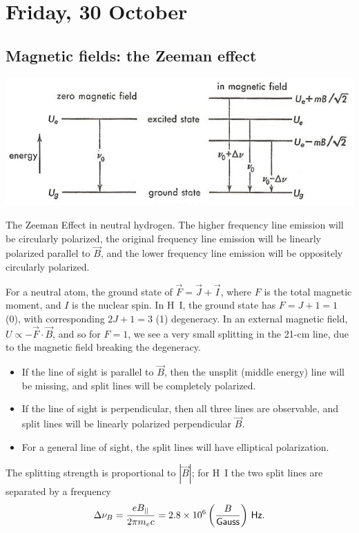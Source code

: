 \documentclass{tufte-handout}
\renewcommand{\rm}{\sf}
\renewcommand{\textrm}{\textsf}
\newcommand{\HI}{\textnormal{H{\smaller~\textsc{I}}}}
\newcommand{\e}[1]{\times 10^{#1}}
\begin{document}
\section{Friday, 30 October}
\subsection{Magnetic fields: the Zeeman effect}

\begin{marginfigure}
\includegraphics{ism_figures/zeeman_effect}
\caption{The Zeeman Effect in neutral hydrogen. The higher frequency line emission will be circularly polarized, the original frequency line emission will be linearly polarized parallel to $\vec B$, and the lower frequency line emission will be oppositely circularly polarized.}
\end{marginfigure}
For a neutral atom, the ground state of $\vec F = \vec J + \vec I$, where $F$ is the total magnetic moment, and $I$ is the nuclear spin. In \HI{}, the ground state has $F = J + 1 = 1$ (0), with corresponding $2J+1 = 3$ (1) degeneracy. In an external magnetic field, $U \propto - \vec F \cdot \vec B$, and so for $F=1$, we see a very small splitting in the 21-cm line, due to the magnetic field breaking the degeneracy.
\begin{itemize}
\item[] If the line of sight is parallel to $\vec B$, then the unsplit (middle energy) line will be missing, and split lines will be completely polarized.
\item[] If the line of sight is perpendicular, then all three lines are observable, and split lines will be linearly polarized perpendicular $\vec B$.
\item[] For a general line of sight, the split lines will have elliptical polarization.
\end{itemize}

The splitting strength is proportional to $|\vec B|$; for \HI{} the two split lines are separated by a frequency
\[\Delta \nu_B = \frac{eB_{||}}{2\pi m_e c} = 2.8\e{6} \left (\frac{B}{\rm Gauss}\right ) \,\textrm{Hz}.\]
\end{document}
